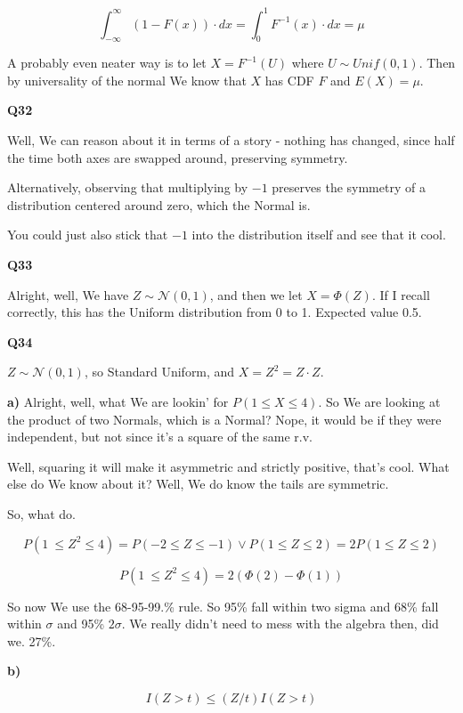\documentclass{article}
\begin{document}
			
			\[ \int^\infty_{-\infty} (1-F(x)) \cdot dx = \int^1_0 F^{-1}(x)\cdot dx = \mu \]
		
			A probably even neater way is to let $X = F^{-1}(U)$ where $U\sim Unif(0, 1)$. Then by universality of the normal We know that $X$ has CDF $F$ and $E(X) = \mu$.
			
			\hfill
			
		\textbf{Q32}
		
			Well, We can reason about it in terms of a story - nothing has changed, since half the time both axes are swapped around, preserving symmetry.
			
			Alternatively, observing that multiplying by $-1$ preserves the symmetry of a distribution centered around zero, which the Normal is.
			
			You could just also stick that $-1$ into the distribution itself and see that it cool.
			
			\hfill
			
		\textbf{Q33}
		
			Alright, well, We have $Z\sim \mathcal{N}(0, 1)$, and then we let $X = \Phi(Z)$. If I recall correctly, this has the Uniform distribution from 0 to 1. Expected value 0.5.
			
			\hfill
		
		\textbf{Q34}
		
			$Z\sim \mathcal{N}(0, 1)$, so Standard Uniform, and $X = Z^2 = Z\cdot Z$.
			
			\textbf{a)} Alright, well, what	We are lookin' for $P(1 \le X \le 4)$. So We are looking at the product of two Normals, which is a Normal? Nope, it would be if they were independent, but not since it's a square of the same r.v.
			
			Well, squaring it will make it asymmetric and strictly positive, that's cool. What else do We know about it? Well, We do know the tails are symmetric.
			
			So, what do. 
			
			\[ P(1 \ \le Z^2 \le 4) = P(-2 \le Z \le -1) \vee P(1 \le Z \le 2) = 2P(1 \le Z \le 2) \]		
			
			\[ P(1 \ \le Z^2 \le 4) = 2(\Phi(2) - \Phi(1)) \]
			
			So now We use the 68-95-99.\% rule. So 95\% fall within two sigma and 68\% fall within $\sigma$ and 95\% $2\sigma$. We really didn't need to mess with the algebra then, did we. 27\%.
			
			\textbf{b)} 
			
			\[ I(Z > t) \le (Z/t)I(Z>t) \]
					
\end{document}
